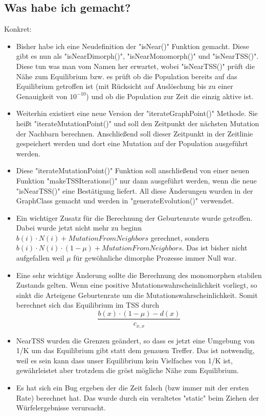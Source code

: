 \documentclass{article}
\begin{document}
\subsection{Was habe ich gemacht?}
Konkret:
\begin{itemize}
	\item Bisher habe ich eine Neudefinition der "{}isNear()"{} Funktion gemacht. Diese gibt es nun als "{}isNearDimorph()"{}, "{}isNearMonomorph()"{} und "{}isNearTSS()"{}. Diese tun was man vom Namen her erwartet, wobei "{}isNearTSS()"{} prüft die Nähe zum Equilibrium bzw. es prüft ob die Population bereits auf das Equilibrium getroffen ist (mit Rücksicht auf Auslöschung bis zu einer Genauigkeit von $10^{-10}$) und ob die Population zur Zeit die einzig aktive ist. 
	\item Weiterhin existiert eine neue Version der "{}iterateGraphPoint()"{} Methode. Sie heißt "{}iterateMutationPoint()"{} und soll den Zeitpunkt der nächsten Mutation der Nachbarn berechnen. Anschließend soll dieser Zeitpunkt in der Zeitlinie gespeichert werden und dort eine Mutation auf der Population ausgeführt werden.
	\item Diese "{}iterateMutationPoint()"{} Funktion soll anschließend von einer neuen Funktion "{}makeTSSIterations()"{} nur dann ausgeführt werden, wenn die neue "{}isNearTSS()"{} eine Bestätigung liefert.
	All diese Änderungen wurden in der GraphClass gemacht und werden in "{}generateEvolution()"{} verwendet.
	\item Ein wichtiger Zusatz für die Berechnung der Geburtenrate wurde getroffen. Dabei wurde jetzt nicht mehr zu beginn $b(i)\cdot N(i) + MutationFromNeighbors$ gerechnet, sondern $b(i)\cdot N(i) \cdot (1-\mu) + MutationFromNeighbors$. Das ist bisher nicht aufgefallen weil $\mu$ für gewöhnliche dimorphe Prozesse immer Null war.
	\item Eine sehr wichtige Änderung sollte die Berechnung des monomorphen stabilen Zustands gelten. Wenn eine positive Mutationswahrscheinlichkeit vorliegt, so sinkt die Arteigene Geburtenrate um die Mutationswahrscheinlichkeit. Somit berechnet sich das Equilibrium im TSS durch \[\frac{b(x)\cdot (1-\mu) - d(x)}{c_{x,x}}\]
	\item NearTSS wurden die Grenzen geändert, so dass es jetzt eine Umgebung von 1/K um das Equilibrium gibt statt dem genauen Treffer. Das ist notwendig, weil es sein kann dass unser Equilibrium kein Vielfaches von 1/K ist, gewährleistet aber trotzdem die gröst mögliche Nähe zum Equilibrium.
	\item Es hat sich ein Bug ergeben der die Zeit falsch (bzw immer mit der ersten Rate) berechnet hat. Das wurde durch ein veraltetes "{}static"{} beim Ziehen der Würfelergebnisse verursacht.

\end{itemize}
\end{document}
